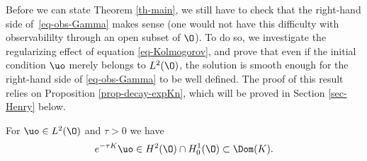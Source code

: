 Before we can state Theorem \ref{th-main}, we still have to check that the right-hand side of~\eqref{eq-obs-Gamma} makes sense (one would not have this difficulty with observabililty through an open subset of $\O$).
To do so, we investigate the regularizing effect of equation \eqref{eq-Kolmogorov}, and prove that
even if the initial condition $\uo$ merely belongs to $L^2(\O)$, the solution is smooth enough for the right-hand side
of \eqref{eq-obs-Gamma} to be well defined.
The proof of this result relies on Proposition \ref{prop-decay-expKn}, which will be proved in Section \ref{sec-Henry} below.

\begin{proposition} \label{prop-regularite}
For $\uo \in L^2(\O)$ and $\tau > 0$ we have
\[
e^{-\tau K} \uo \in H^2(\O) \cap H^1_0(\O) \subset \Dom(K).
\]
\end{proposition}

